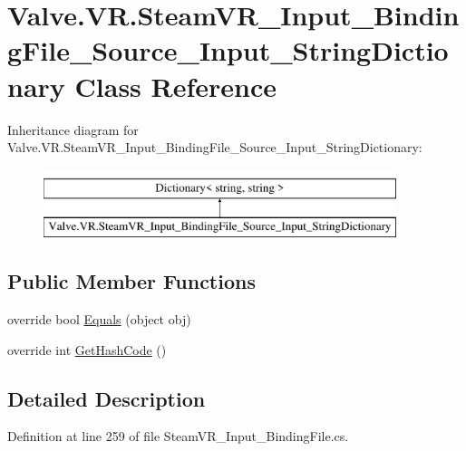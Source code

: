 \hypertarget{class_valve_1_1_v_r_1_1_steam_v_r___input___binding_file___source___input___string_dictionary}{}\section{Valve.\+V\+R.\+Steam\+V\+R\+\_\+\+Input\+\_\+\+Binding\+File\+\_\+\+Source\+\_\+\+Input\+\_\+\+String\+Dictionary Class Reference}
\label{class_valve_1_1_v_r_1_1_steam_v_r___input___binding_file___source___input___string_dictionary}
Inheritance diagram for Valve.\+V\+R.\+Steam\+V\+R\+\_\+\+Input\+\_\+\+Binding\+File\+\_\+\+Source\+\_\+\+Input\+\_\+\+String\+Dictionary\+:\begin{figure}[H]
\begin{center}
\leavevmode
\includegraphics[height=2.000000cm]{class_valve_1_1_v_r_1_1_steam_v_r___input___binding_file___source___input___string_dictionary}
\end{center}
\end{figure}
\subsection*{Public Member Functions}
\begin{DoxyCompactItemize}
\item 
override bool \mbox{\hyperlink{class_valve_1_1_v_r_1_1_steam_v_r___input___binding_file___source___input___string_dictionary_a78f733f27ca8ad1e77c734247e17e211}{Equals}} (object obj)
\item 
override int \mbox{\hyperlink{class_valve_1_1_v_r_1_1_steam_v_r___input___binding_file___source___input___string_dictionary_a4b9ebd4a50453d823222877f25ba46ab}{Get\+Hash\+Code}} ()
\end{DoxyCompactItemize}


\subsection{Detailed Description}


Definition at line 259 of file Steam\+V\+R\+\_\+\+Input\+\_\+\+Binding\+File.\+cs.



